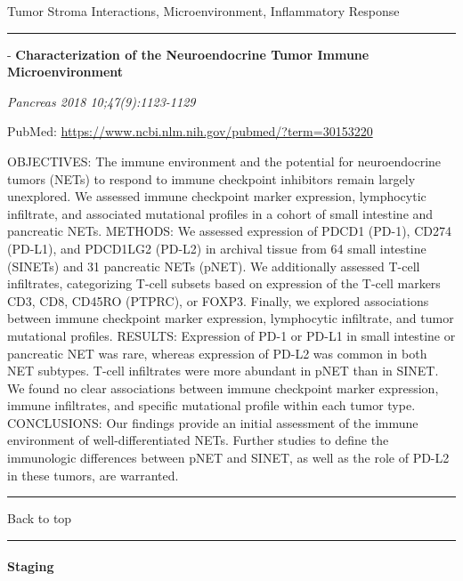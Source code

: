 \documentclass[]{article}
\let\oldparagraph\paragraph
\renewcommand{\paragraph}[1]{\oldparagraph{#1}\mbox{}}
\begin{document}
Tumor Stroma Interactions, Microenvironment, Inflammatory Response

\begin{center}\rule{0.5\linewidth}{\linethickness}\end{center}

 - \textbf{Characterization of the Neuroendocrine Tumor Immune
Microenvironment}

\emph{Pancreas 2018 10;47(9):1123-1129}

PubMed: \url{https://www.ncbi.nlm.nih.gov/pubmed/?term=30153220}

OBJECTIVES: The immune environment and the potential for neuroendocrine
tumors (NETs) to respond to immune checkpoint inhibitors remain largely
unexplored. We assessed immune checkpoint marker expression, lymphocytic
infiltrate, and associated mutational profiles in a cohort of small
intestine and pancreatic NETs. METHODS: We assessed expression of PDCD1
(PD-1), CD274 (PD-L1), and PDCD1LG2 (PD-L2) in archival tissue from 64
small intestine (SINETs) and 31 pancreatic NETs (pNET). We additionally
assessed T-cell infiltrates, categorizing T-cell subsets based on
expression of the T-cell markers CD3, CD8, CD45RO (PTPRC), or FOXP3.
Finally, we explored associations between immune checkpoint marker
expression, lymphocytic infiltrate, and tumor mutational profiles.
RESULTS: Expression of PD-1 or PD-L1 in small intestine or pancreatic
NET was rare, whereas expression of PD-L2 was common in both NET
subtypes. T-cell infiltrates were more abundant in pNET than in SINET.
We found no clear associations between immune checkpoint marker
expression, immune infiltrates, and specific mutational profile within
each tumor type. CONCLUSIONS: Our findings provide an initial assessment
of the immune environment of well-differentiated NETs. Further studies
to define the immunologic differences between pNET and SINET, as well as
the role of PD-L2 in these tumors, are warranted.

{}

{}

\begin{center}\rule{0.5\linewidth}{\linethickness}\end{center}

Back to top

\begin{center}\rule{0.5\linewidth}{\linethickness}\end{center}

\pagebreak

\hypertarget{staging-3}{%
\paragraph{Staging}\label{staging-3}}
\end{document}
